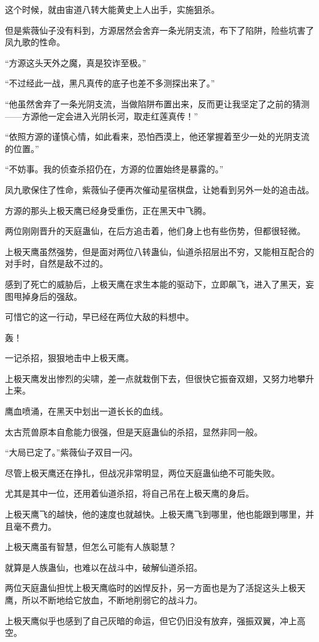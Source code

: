 \begin{this_body}
这个时候，就由宙道八转大能黄史上人出手，实施狙杀。

但是紫薇仙子没有料到，方源居然会舍弃一条光阴支流，布下了陷阱，险些坑害了凤九歌的性命。

“方源这头天外之魔，真是狡诈至极。”

“不过经此一战，黑凡真传的底子也差不多测探出来了。”

“他虽然舍弃了一条光阴支流，当做陷阱布置出来，反而更让我坚定了之前的猜测——方源他一定会进入光阴长河，取走红莲真传！”

“依照方源的谨慎心情，如此看来，恐怕西漠上，他还掌握着至少一处的光阴支流的位置。”

“不妨事。我的侦查杀招仍在，方源的位置始终是暴露的。”

凤九歌保住了性命，紫薇仙子便再次催动星宿棋盘，让她看到另外一处的追击战。

方源的那头上极天鹰已经身受重伤，正在黑天中飞腾。

两位刚刚晋升的天庭蛊仙，在后方追击着，他们身上也有些伤势，但都很轻微。

上极天鹰虽然强势，但是面对两位八转蛊仙，仙道杀招层出不穷，又能相互配合的对手时，自然是敌不过的。

感到了死亡的威胁后，上极天鹰在求生本能的驱动下，立即飙飞，进入了黑天，妄图甩掉身后的强敌。

可惜它的这一行动，早已经在两位大敌的料想中。

轰！

一记杀招，狠狠地击中上极天鹰。

上极天鹰发出惨烈的尖啸，差一点就栽倒下去，但很快它振奋双翅，又努力地攀升上来。

鹰血喷涌，在黑天中划出一道长长的血线。

太古荒兽原本自愈能力很强，但是天庭蛊仙的杀招，显然非同一般。

“大局已定了。”紫薇仙子双目一闪。

尽管上极天鹰还在挣扎，但战况非常明显，两位天庭蛊仙绝不可能失败。

尤其是其中一位，还用着仙道杀招，将自己吊在上极天鹰的身后。

上极天鹰飞的越快，他的速度也就越快。上极天鹰飞到哪里，他也能跟到哪里，并且毫不费力。

上极天鹰虽有智慧，但怎么可能有人族聪慧？

就算是人族蛊仙，也难以在战斗中，破解仙道杀招。

两位天庭蛊仙担忧上极天鹰临时的凶悍反扑，另一方面也是为了活捉这头上极天鹰，所以不断地给它放血，不断地削弱它的战斗力。

上极天鹰似乎也感到了自己灰暗的命运，但它仍旧没有放弃，强振双翼，冲上高空。


\end{this_body}
